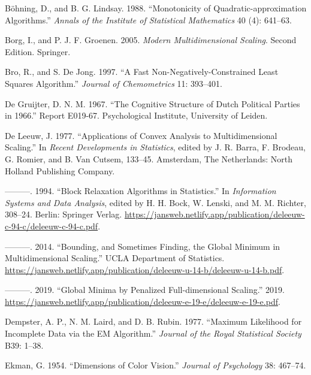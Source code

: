 \documentclass[
  12pt,
]{article}
\newlength{\cslhangindent}
\newenvironment{CSLReferences}[2] %
 {\begin{list}{}{%
  \setlength{\itemindent}{0pt}
  \setlength{\leftmargin}{0pt}
  \setlength{\parsep}{0pt}
  \ifodd #1
   \setlength{\leftmargin}{\cslhangindent}
   \setlength{\itemindent}{-1\cslhangindent}
  \fi
  \setlength{\itemsep}{#2\baselineskip}}}
 {\end{list}}
\begin{document}
\label{refs}
\begin{CSLReferences}{1}{0}
Böhning, D., and B. G. Lindsay. 1988. {``{Monotonicity of Quadratic-approximation Algorithms}.''} \emph{Annals of the Institute of Statistical Mathematics} 40 (4): 641--63.

Borg, I., and P. J. F. Groenen. 2005. \emph{Modern Multidimensional Scaling}. Second Edition. Springer.

Bro, R., and S. De Jong. 1997. {``A Fast Non-Negatively-Constrained Least Squares Algorithm.''} \emph{Journal of Chemometrics} 11: 393--401.

De Gruijter, D. N. M. 1967. {``{The Cognitive Structure of Dutch Political Parties in 1966}.''} Report E019-67. Psychological Institute, University of Leiden.

De Leeuw, J. 1977. {``Applications of Convex Analysis to Multidimensional Scaling.''} In \emph{Recent Developments in Statistics}, edited by J. R. Barra, F. Brodeau, G. Romier, and B. Van Cutsem, 133--45. Amsterdam, The Netherlands: North Holland Publishing Company.

---------. 1994. {``{Block Relaxation Algorithms in Statistics}.''} In \emph{Information Systems and Data Analysis}, edited by H. H. Bock, W. Lenski, and M. M. Richter, 308--24. Berlin: Springer Verlag. \url{https://jansweb.netlify.app/publication/deleeuw-c-94-c/deleeuw-c-94-c.pdf}.

---------. 2014. {``{Bounding, and Sometimes Finding, the Global Minimum in Multidimensional Scaling}.''} UCLA Department of Statistics. \url{https://jansweb.netlify.app/publication/deleeuw-u-14-b/deleeuw-u-14-b.pdf}.

---------. 2019. {``{Global Minima by Penalized Full-dimensional Scaling}.''} 2019. \url{https://jansweb.netlify.app/publication/deleeuw-e-19-e/deleeuw-e-19-e.pdf}.

Dempster, A. P., N. M. Laird, and D. B. Rubin. 1977. {``{Maximum Likelihood for Incomplete Data via the EM Algorithm}.''} \emph{Journal of the Royal Statistical Society} B39: 1--38.

Ekman, G. 1954. {``{Dimensions of Color Vision}.''} \emph{Journal of Psychology} 38: 467--74.


\end{CSLReferences}
\end{document}
